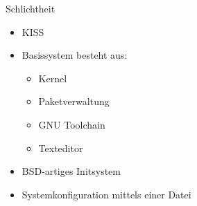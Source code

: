 \begin{slide}{Schlichtheit}
	\begin{itemize}
		\item{KISS}
		\item{Basissystem besteht aus:
			\begin{itemize}
				\item{Kernel}
				\item{Paketverwaltung}
				\item{GNU Toolchain}
				\item{Texteditor}
			\end{itemize}
		}
		\item{BSD-artiges Initsystem}
		\item{Systemkonfiguration mittels einer Datei}
	\end{itemize}
\end{slide}

